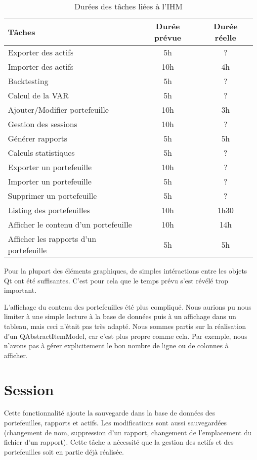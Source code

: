 \documentclass[a4paper]{report}
\begin{document}
\begin{table}[H]
\centering
  \begin{tabularx}{0.8\textwidth}{| X | c | c |}
    \hline
	Tâches & Durée prévue & Durée réelle \\
    \hline
    Exporter des actifs & 5h & ?\\
    Importer des actifs & 10h & 4h\\
    Backtesting & 5h & ?\\
    Calcul de la VAR & 5h & ?\\
    Ajouter/Modifier portefeuille & 10h & 3h\\
    Gestion des sessions & 10h & ?\\
    Générer rapports & 5h & 5h\\
    Calculs statistiques & 5h & ?\\
    Exporter un portefeuille & 10h & ?\\
    Importer un portefeuille & 5h & ?\\
    Supprimer un portefeuille & 5h & ?\\
    Listing des portefeuilles & 10h & 1h30\\
    Afficher le contenu d'un portefeuille & 10h & 14h\\
    Afficher les rapports d'un portefeuille & 5h & 5h\\
    \hline
  \end{tabularx}
  \caption{Durées des tâches liées à l'IHM}
\end{table}

Pour la plupart des éléments graphiques, de simples intéractions entre les objets Qt ont été suffisantes.
C'est pour cela que le temps prévu s'est révélé trop important.

L'affichage du contenu des portefeuilles été plus compliqué.
Nous aurions pu nous limiter à une simple lecture à la base de données puis à un affichage dans un tableau, mais ceci n'était pas très adapté.
Nous sommes partis sur la réalisation d'un QAbstractItemModel, car c'est plus propre comme cela.
Par exemple, nous n'avons pas à gérer explicitement le bon nombre de ligne ou de colonnes à afficher.


\section{Session}

Cette fonctionnalité ajoute la sauvegarde dans la base de données des portefeuilles, rapports et actifs.
Les modifications sont aussi sauvegardées (changement de nom, suppression d'un rapport, changement de l'emplacement du fichier d'un rapport).
Cette tâche a nécessité que la gestion des actifs et des portefeuilles soit en partie déjà réalisée.
\end{document}

